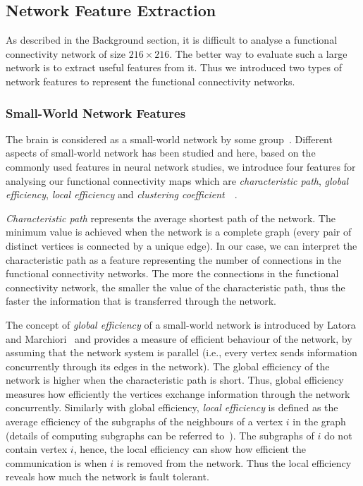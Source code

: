 \subsection{Network Feature Extraction}
As described in the Background section, it is difficult to analyse a functional connectivity network of size $216 \times 216$. The better way to evaluate such a large network is to extract useful features from it. Thus we introduced two types of network features to represent the functional connectivity networks. 

\subsubsection{Small-World Network Features}
The brain is considered as a small-world network by some group~\cite{bassett2006small}. Different aspects of small-world network has been studied and here, based on the commonly used features in neural network studies, we introduce four features for analysing our functional connectivity maps which are \emph{characteristic path}, \emph{global efficiency}, \emph{local efficiency} and \emph{clustering coefficient}~\cite{watts1998collective}~\cite{latora2001efficient}.

\emph{Characteristic path} represents the average shortest path of the network. The minimum value is achieved when the network is a complete graph (every pair of distinct vertices is connected by a unique edge). In our case, we can interpret the characteristic path as a feature representing the number of connections in the functional connectivity networks. The more the connections in the functional connectivity network, the smaller the value of the characteristic path, thus the faster the information that is transferred through the network. 

The concept of \emph{global efficiency} of a small-world network is introduced by Latora and Marchiori~\cite{latora2001efficient} and provides a measure of efficient behaviour of the network, by assuming that the network system is parallel (i.e., every vertex sends information concurrently through its edges in the network). The global efficiency of the network is higher when the characteristic path is short. Thus, global efficiency measures how efficiently the vertices exchange information through the network concurrently. Similarly with global efficiency, \emph{local efficiency} is defined as the average efficiency of the subgraphs of the neighbours of a vertex $i$ in the graph (details of computing subgraphs can be referred to~\cite{ullmann1976algorithm}). The subgraphs of $i$ do not contain vertex $i$, hence, the local efficiency can show how efficient the communication is when $i$ is removed from the network. Thus the local efficiency reveals how much the network is fault tolerant. 

